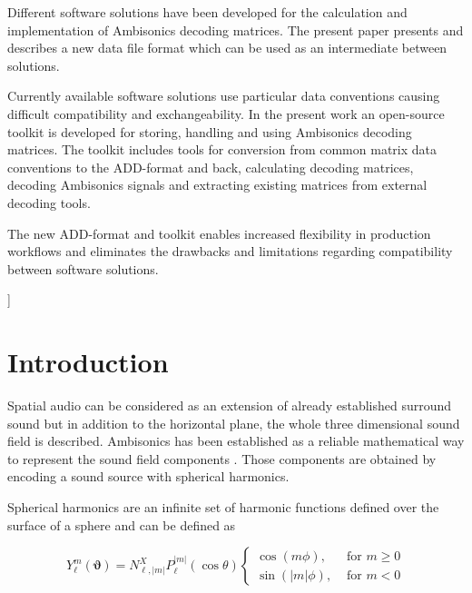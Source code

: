 \documentclass[a4paper, 10pt, twocolumn]{article}
\begin{document}
{\vspace{-3mm}}
\begin{onecolabstract}
{\vspace{3mm}}

Different software solutions have been developed for the calculation and implementation of Ambisonics decoding matrices. The present paper presents and describes a new data file format which can be used as an intermediate between solutions.

Currently available software solutions use particular data conventions causing difficult compatibility and exchangeability. In the present work an open-source toolkit is developed for storing, handling and using Ambisonics decoding matrices. The toolkit includes tools for conversion from common matrix data conventions to the ADD-format and back, calculating decoding matrices, decoding Ambisonics signals and extracting existing matrices from external decoding tools. 

The new ADD-format and toolkit enables increased flexibility in production workflows and eliminates the drawbacks and limitations regarding compatibility between software solutions.

\end{onecolabstract}
{\vspace{8mm}}]

\section{Introduction} \label{sec:introduction}

Spatial audio can be considered as an extension of already established surround sound but in addition to the horizontal plane, the whole three dimensional sound field is described. Ambisonics has been established as a reliable mathematical way to represent the sound field components \autocite{gerzon}. Those components are obtained by encoding a sound source with spherical harmonics.

Spherical harmonics are an infinite set of harmonic functions defined over the surface of a sphere and can be defined as 

\begin{equation}
Y_{\ell}^{m}(\boldsymbol{\vartheta})=N_{\ell,|m|}^{X} P_{\ell}^{|m|}(\cos \theta)\left\{\begin{array}{cc}{\cos (m \phi),} & {\text { for } m \geq 0} \\ {\sin (|m| \phi),} & {\text { for } m<0}\end{array}\right.
\end{equation}
\end{document}
